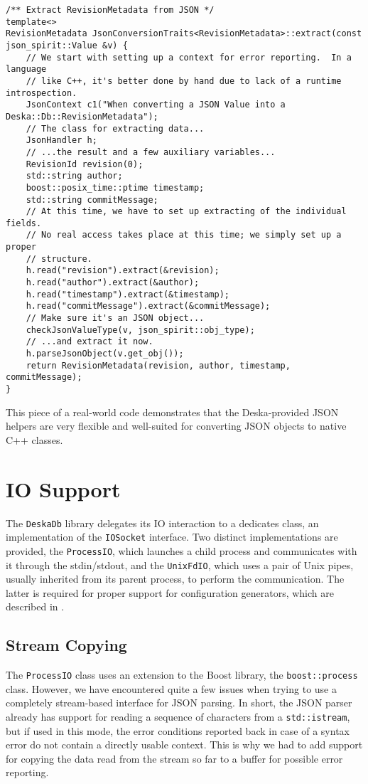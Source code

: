 \documentclass[deska]{subfiles}
\begin{document}
\begin{verbatim}
/** Extract RevisionMetadata from JSON */
template<>
RevisionMetadata JsonConversionTraits<RevisionMetadata>::extract(const json_spirit::Value &v) {
    // We start with setting up a context for error reporting.  In a language
    // like C++, it's better done by hand due to lack of a runtime introspection.
    JsonContext c1("When converting a JSON Value into a Deska::Db::RevisionMetadata");
    // The class for extracting data...
    JsonHandler h;
    // ...the result and a few auxiliary variables...
    RevisionId revision(0);
    std::string author;
    boost::posix_time::ptime timestamp;
    std::string commitMessage;
    // At this time, we have to set up extracting of the individual fields.
    // No real access takes place at this time; we simply set up a proper
    // structure.
    h.read("revision").extract(&revision);
    h.read("author").extract(&author);
    h.read("timestamp").extract(&timestamp);
    h.read("commitMessage").extract(&commitMessage);
    // Make sure it's an JSON object...
    checkJsonValueType(v, json_spirit::obj_type);
    // ...and extract it now.
    h.parseJsonObject(v.get_obj());
    return RevisionMetadata(revision, author, timestamp, commitMessage);
}
\end{verbatim}

This piece of a real-world code demonstrates that the Deska-provided JSON helpers are very flexible and well-suited for
converting JSON objects to native C++ classes.

\section{IO Support}

The {\tt DeskaDb} library delegates its IO interaction to a dedicates class, an implementation of the {\tt IOSocket}
interface.  Two distinct implementations are provided, the {\tt ProcessIO}, which launches a child process and
communicates with it through the stdin/stdout, and the {\tt UnixFdIO}, which uses a pair of Unix pipes, usually
inherited from its parent process, to perform the communication.  The latter is required for proper support for
configuration generators, which are described in .

\subsection{Stream Copying}

The {\tt ProcessIO} class uses an extension to the Boost library, the {\tt boost::process} class.  However, we have
encountered quite a few issues when trying to use a completely stream-based interface for JSON parsing.  In short, the
JSON parser already has support for reading a sequence of characters from a {\tt std::istream}, but if used in this
mode, the error conditions reported back in case of a syntax error do not contain a directly usable context.  This is
why we had to add support for copying the data read from the stream so far to a buffer for possible error reporting.
\end{document}
